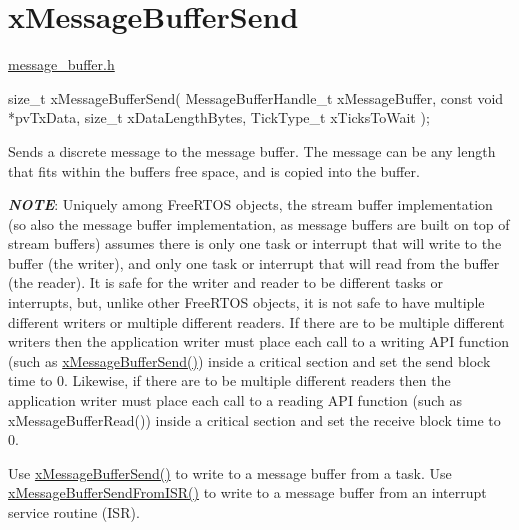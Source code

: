 \hypertarget{group__x_message_buffer_send}{}\section{x\+Message\+Buffer\+Send}
\label{group__x_message_buffer_send}
\hyperlink{message__buffer_8h}{message\+\_\+buffer.\+h}


\begin{DoxyPre}
size\_t xMessageBufferSend( MessageBufferHandle\_t xMessageBuffer,
                        const void *pvTxData,
                        size\_t xDataLengthBytes,
                        TickType\_t xTicksToWait );
\end{DoxyPre}


Sends a discrete message to the message buffer. The message can be any length that fits within the buffer\textquotesingle{}s free space, and is copied into the buffer.

{\itshape {\bfseries N\+O\+TE}}\+: Uniquely among Free\+R\+T\+OS objects, the stream buffer implementation (so also the message buffer implementation, as message buffers are built on top of stream buffers) assumes there is only one task or interrupt that will write to the buffer (the writer), and only one task or interrupt that will read from the buffer (the reader). It is safe for the writer and reader to be different tasks or interrupts, but, unlike other Free\+R\+T\+OS objects, it is not safe to have multiple different writers or multiple different readers. If there are to be multiple different writers then the application writer must place each call to a writing A\+PI function (such as \hyperlink{message__buffer_8h_a858f6da6fe24a226c45caf1634ea1605}{x\+Message\+Buffer\+Send()}) inside a critical section and set the send block time to 0. Likewise, if there are to be multiple different readers then the application writer must place each call to a reading A\+PI function (such as x\+Message\+Buffer\+Read()) inside a critical section and set the receive block time to 0.

Use \hyperlink{message__buffer_8h_a858f6da6fe24a226c45caf1634ea1605}{x\+Message\+Buffer\+Send()} to write to a message buffer from a task. Use \hyperlink{message__buffer_8h_aeef5b0c4f8c2db6ca2230a8874813e79}{x\+Message\+Buffer\+Send\+From\+I\+S\+R()} to write to a message buffer from an interrupt service routine (I\+SR).


